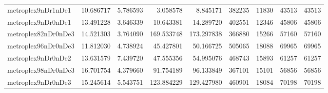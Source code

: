 \begin{longtable}{|l|r|r|r|r|r|r|r|r|}
metroplex9nDr1nDe1 & 10.686717 & 5.786593 & 3.058578 & 8.845171 & 382235 & 11830 & 43513 & 43513 \\
metroplex9nDr0nDe1 & 13.491228 & 3.646339 & 10.643381 & 14.289720 & 402551 & 12346 & 45806 & 45806 \\
metroplex82nDr0nDe3 & 14.521303 & 3.764090 & 169.533748 & 173.297838 & 366880 & 15266 & 57160 & 57160 \\
metroplex96nDr0nDe3 & 11.812030 & 4.738924 & 45.427801 & 50.166725 & 505065 & 18088 & 69965 & 69965 \\
metroplex9nDr0nDe2 & 13.631579 & 7.439720 & 47.555356 & 54.995076 & 468743 & 15893 & 61257 & 61257 \\
metroplex98nDr0nDe3 & 16.701754 & 4.379660 & 91.754189 & 96.133849 & 367101 & 15101 & 56856 & 56856 \\
metroplex9nDr0nDe3 & 15.245614 & 5.543751 & 123.884229 & 129.427980 & 460901 & 18084 & 70198 & 70198 \\
\end{longtable}
